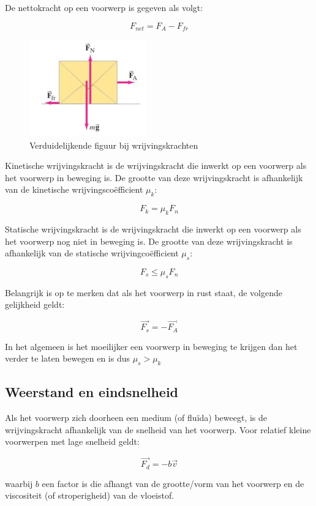 \documentclass[12pt,a4paper]{article}
\begin{document}
    De nettokracht op een voorwerp is gegeven als volgt:
    
    $$ F_{net} = F_{A} -  F_{fr} $$
    
     \begin{figure}[h]
        \centering
        \includegraphics[width=0.3\linewidth]{papierdoos}
        \caption{Verduidelijkende figuur bij wrijvingskrachten}
        \label{papierdoos}
    \end{figure}    
        
    Kinetische wrijvingskracht is de wrijvingskracht die inwerkt op een voorwerp als het voorwerp in beweging is.    
    De grootte van deze wrijvingskracht is afhankelijk van de kinetische wrijvingscoëfficient $\mu_{k}$:
    
   $$ F_{k} = \mu_{k}F_{n} $$
   
   Statische wrijvingskracht is de wrijvingskracht die inwerkt op een voorwerp als het voorwerp nog niet in beweging is.
   De grootte van deze wrijvingskracht is afhankelijk van de statische wrijvingcoëfficient $\mu_{s}$:
   
   $$F_{s} \leq \mu_{s}F_{n}$$
   
   Belangrijk is op te merken dat als het voorwerp in rust staat, de volgende gelijkheid geldt:
   
   $$\vec{F_{s}} = -\vec{F_{A}}$$
   
   In het algemeen is het moeilijker een voorwerp in beweging te krijgen dan het verder te laten bewegen en is dus $\mu_{s} > \mu_{k}$
   
   \subsection{Weerstand en eindsnelheid}
   Als het voorwerp zich doorheen een medium (of fluïda) beweegt, is de wrijvingskracht afhankelijk van de snelheid van het voorwerp.
   Voor relatief kleine voorwerpen met lage snelheid geldt:
   
   $$ \vec{F_{d}} = -b\vec{v} $$
   
   waarbij $b$ een factor is die afhangt van de grootte/vorm van het voorwerp en de viscositeit (of stroperigheid)
   van de vloeistof.
   
\end{document}
